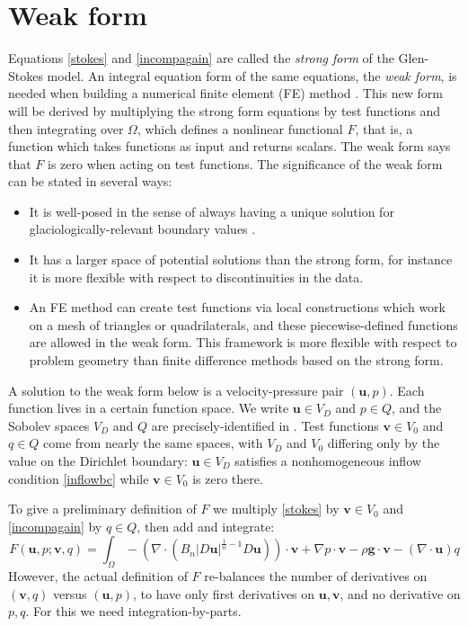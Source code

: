 \documentclass[letterpaper,final,12pt,reqno]{amsart}
\newcommand{\bu}{\mathbf{u}}
\newcommand{\bv}{\mathbf{v}}
\begin{document}
\section{Weak form} \label{sec:weakform}

Equations \eqref{stokes} and \eqref{incompagain} are called the \emph{strong form} of the Glen-Stokes model.  An integral equation form of the same equations, the \emph{weak form}, is needed when building a numerical finite element (FE) method \cite{Elmanetal2014}.  This new form will be derived by multiplying the strong form equations by test functions and then integrating over $\Omega$, which defines a nonlinear functional $F$, that is, a function which takes functions as input and returns scalars.  The weak form says that $F$ is zero when acting on test functions.  The significance of the weak form can be stated in several ways:
\begin{itemize}
\item It is well-posed in the sense of always having a unique solution  for glaciologically-relevant boundary values \cite{JouvetRappaz2011}.
\item It has a larger space of potential solutions than the strong form, for instance it is more flexible with respect to discontinuities in the data.
\item An FE method can create test functions via local constructions which work on a mesh of triangles or quadrilaterals, and these piecewise-defined functions are allowed in the weak form.  This framework is more flexible with respect to problem geometry than finite difference methods based on the strong form.
\end{itemize}

A solution to the weak form below is a velocity-pressure pair $(\bu,p)$.  Each function lives in a certain function space.  We write $\bu\in V_D$ and $p \in Q$, and the Sobolev spaces $V_D$ and $Q$ are precisely-identified in \cite{JouvetRappaz2011}.  Test functions $\bv\in V_0$ and $q\in Q$ come from nearly the same spaces, with $V_D$ and $V_0$ differing only by the value on the Dirichlet boundary: $\bu\in V_D$ satisfies a nonhomogeneous inflow condition \eqref{inflowbc} while $\bv\in V_0$ is zero there.

To give a preliminary definition of $F$ we multiply \eqref{stokes} by $\bv\in V_0$ and \eqref{incompagain} by $q\in Q$, then add and integrate:
\begin{equation}
F(\bu,p;\bv,q) = \int_\Omega - \left(\nabla \cdot \left(B_n |D\bu|^{\frac{1}{n} - 1} D\bu\right)\right)\cdot \bv + \nabla p \cdot \bv - \rho \mathbf{g} \cdot \bv - \left(\nabla \cdot \bu\right) q \label{nonfuncone}
\end{equation}
However, the actual definition of $F$ re-balances the number of derivatives on $(\bv,q)$ versus $(\bu,p)$, to have only first derivatives on $\bu,\bv$, and no derivative on $p,q$.  For this we need integration-by-parts.
\end{document}
